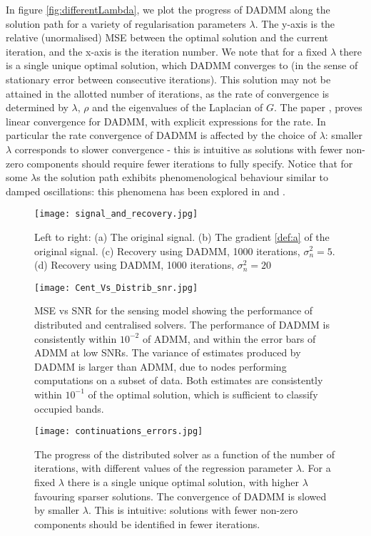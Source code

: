 In figure \eqref{fig:differentLambda}, we plot the progress of DADMM along the solution path for a variety of regularisation parameters \(\lambda\). The y-axis is the relative (unormalised) MSE between the optimal solution and the current iteration, and the x-axis is the iteration number. We note that for a fixed \(\lambda\) there is a single unique optimal solution, which DADMM converges to (in the sense of stationary error between consecutive iterations). This solution may not be attained in the allotted number of iterations, as the rate of convergence is determined by \(\lambda\), \(\rho\) and the eigenvalues of the Laplacian of \(G\). The paper \cite{shi2014linear}, proves linear convergence for DADMM, with explicit expressions for the rate. In particular the rate convergence of DADMM is affected by the choice of \(\lambda\): smaller \(\lambda\) corresponds to slower convergence - this is intuitive as solutions with fewer non-zero components should require fewer iterations to fully specify. Notice that for some \(\lambda\)s the solution path exhibits phenomenological  behaviour similar to damped oscillations: this phenomena has been explored in \cite{nishihara2015general} and \cite{su2014differential}.  

\begin{figure}[h]
\centering
\texttt{[image: signal\_and\_recovery.jpg]}
\caption{Left to right: (a) The original signal. (b) The gradient \eqref{def:a} of the original signal. (c) Recovery using DADMM, 1000 iterations, \(\sigma^2_n = 5\). (d) Recovery using DADMM, 1000 iterations, \(\sigma^2_n = 20\)  }
\label{different_sigs}
\end{figure}

\begin{figure}[h]
\centering
\texttt{[image: Cent\_Vs\_Distrib\_snr.jpg]}
\caption{MSE vs SNR for the sensing model showing the performance of distributed and centralised solvers. The performance of DADMM is consistently within \(10^{-2}\) of ADMM, and within the error bars of ADMM at low SNRs. The variance of estimates produced by DADMM is larger than ADMM, due to nodes performing computations on a subset of data. Both estimates are consistently within \(10^{-1}\) of the optimal solution, which is sufficient to classify occupied bands.} 
\label{msevssnr0}
\end{figure}

\begin{figure}[h]
\centering
\texttt{[image: continuations\_errors.jpg]}
\caption{The progress of the distributed solver as a function of the number of iterations, with different values of the regression parameter \( \lambda \). For a fixed \( \lambda \) there is a single unique optimal solution, with higher \( \lambda \) favouring sparser solutions. The convergence of DADMM is slowed by smaller \( \lambda \). This is intuitive: solutions with fewer non-zero components should be identified in fewer iterations.}
\label{fig:differentLambda}
\end{figure}

